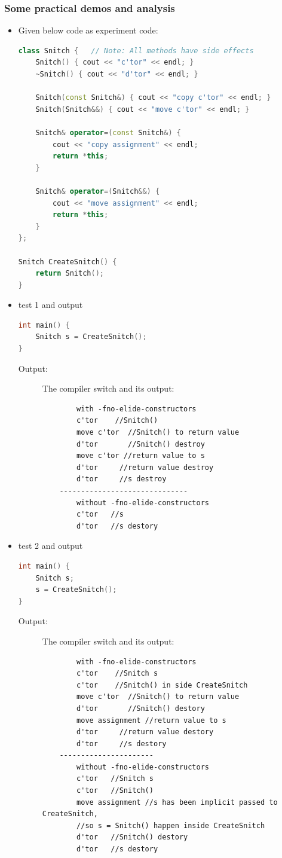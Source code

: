 \documentclass[a4paper,11pt,twoside]{book}
\begin{document}
\subsubsection{Some practical demos and analysis}
\begin{itemize}
	
	\item Given below code as experiment code:
\begin{lstlisting}[frame=single, language=c++]
class Snitch {   // Note: All methods have side effects
	Snitch() { cout << "c'tor" << endl; }
	~Snitch() { cout << "d'tor" << endl; }
	
	Snitch(const Snitch&) { cout << "copy c'tor" << endl; }
	Snitch(Snitch&&) { cout << "move c'tor" << endl; }
	
	Snitch& operator=(const Snitch&) {
		cout << "copy assignment" << endl;
		return *this;
	}
	
	Snitch& operator=(Snitch&&) {
		cout << "move assignment" << endl;
		return *this;
	}
};
	
Snitch CreateSnitch() {
	return Snitch();
}
	\end{lstlisting}
	
	\item test 1 and output 
\begin{lstlisting}[frame=single, language=c++]
int main() {
	Snitch s = CreateSnitch();
}
\end{lstlisting}
\begin{description}
	\item[Output:] The compiler switch and its output:
	\begin{verbatim}
		with -fno-elide-constructors
		c'tor    //Snitch()
		move c'tor  //Snitch() to return value
		d'tor       //Snitch() destroy
		move c'tor //return value to s
		d'tor     //return value destroy
		d'tor     //s destroy
	------------------------------
		without -fno-elide-constructors
		c'tor   //s
		d'tor   //s destory
	\end{verbatim}
\end{description}
	
	\item test 2 and output
	\begin{lstlisting}[frame=single, language=c++]
int main() {
	Snitch s;
	s = CreateSnitch();
}
	\end{lstlisting}
\begin{description}
	\item[Output:] The compiler switch and its output:
	\begin{verbatim}
		with -fno-elide-constructors
		c'tor    //Snitch s
		c'tor    //Snitch() in side CreateSnitch
		move c'tor  //Snitch() to return value
		d'tor       //Snitch() destory
		move assignment //return value to s
		d'tor     //return value destory
		d'tor     //s destory
	----------------------	
		without -fno-elide-constructors
		c'tor   //Snitch s
		c'tor   //Snitch()
		move assignment //s has been implicit passed to CreateSnitch, 
		//so s = Snitch() happen inside CreateSnitch
		d'tor   //Snitch() destory
		d'tor   //s destory
	\end{verbatim}
\end{description}


\end{itemize}
\end{document}
